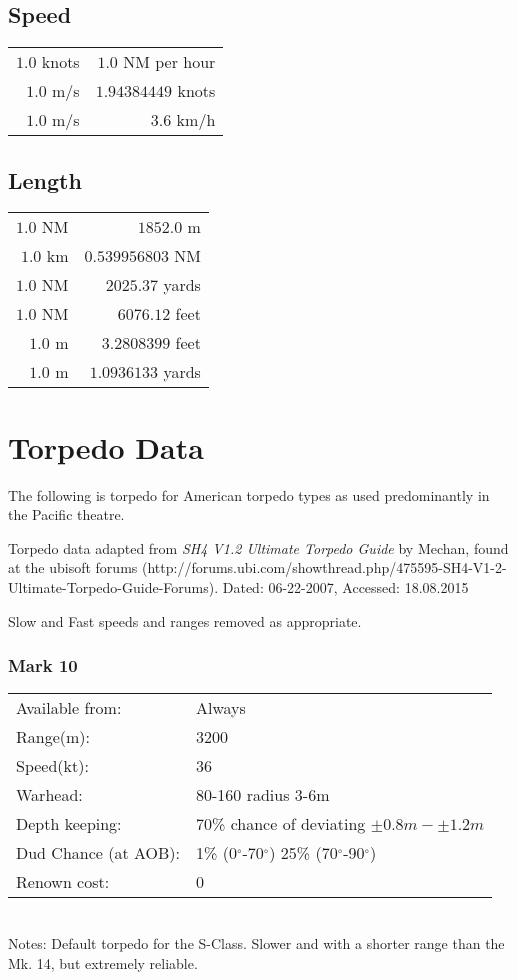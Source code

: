 \documentclass{article}
\newcommand{\degree}{$^{\circ}$}
\begin{document}
\subsection{Speed}
\begin{center}
\begin{tabular}{r | r}
$1.0$ knots & $1.0$ NM per hour\\
$1.0$ m/s & $1.94384449$ knots\\
$1.0$ m/s & $3.6$ km/h\\
\end{tabular}
\end{center}

\subsection{Length}
\begin{center}
\begin{tabular}{r | r}
$1.0$ NM & $1852.0$ m\\
$1.0$ km & $0.539956803$ NM\\
$1.0$ NM & $2025.37$ yards\\
$1.0$ NM & $6076.12$ feet\\
$1.0$ m & $3.2808399$ feet\\
$1.0$ m & $1.0936133$ yards\\
\end{tabular}
\end{center}

\section{Torpedo Data}

The following is torpedo for American torpedo types as used predominantly in the Pacific theatre.

Torpedo data adapted from \emph{SH4 V1.2 Ultimate Torpedo Guide} by Mechan, found at the ubisoft forums (http://forums.ubi.com/showthread.php/475595-SH4-V1-2-Ultimate-Torpedo-Guide-Forums). Dated: 06-22-2007, Accessed: 18.08.2015

Slow and Fast speeds and ranges removed as appropriate.

\subsubsection{Mark 10}
\begin{tabular}{l|l}
Available from:& Always\\
Range(m):& 3200\\
Speed(kt):&36\\
Warhead:& 80-160 radius 3-6m\\
Depth keeping:& 70\% chance of deviating $\pm 0.8m - \pm 1.2m$\\
Dud Chance (at AOB):& 1\% (0\degree -70\degree ) 25\% (70\degree-90\degree)\\
Renown cost:& 0\\
\end{tabular} \\
Notes: Default torpedo for the S-Class. Slower and with a shorter range than the Mk. 14, but extremely reliable.\\
\end{document}
